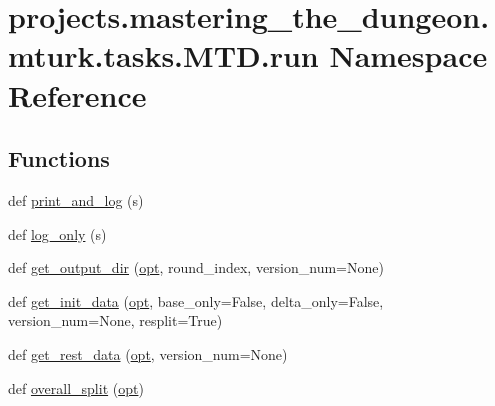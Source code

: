 \hypertarget{namespaceprojects_1_1mastering__the__dungeon_1_1mturk_1_1tasks_1_1MTD_1_1run}{}\section{projects.\+mastering\+\_\+the\+\_\+dungeon.\+mturk.\+tasks.\+M\+T\+D.\+run Namespace Reference}
\label{namespaceprojects_1_1mastering__the__dungeon_1_1mturk_1_1tasks_1_1MTD_1_1run}
\subsection*{Functions}
\begin{DoxyCompactItemize}
\item 
def \hyperlink{namespaceprojects_1_1mastering__the__dungeon_1_1mturk_1_1tasks_1_1MTD_1_1run_acdf4e0fae33f363cf0b352a72788f9bd}{print\+\_\+and\+\_\+log} (s)
\item 
def \hyperlink{namespaceprojects_1_1mastering__the__dungeon_1_1mturk_1_1tasks_1_1MTD_1_1run_ab07d5984a91787cd069fa0a7deba945f}{log\+\_\+only} (s)
\item 
def \hyperlink{namespaceprojects_1_1mastering__the__dungeon_1_1mturk_1_1tasks_1_1MTD_1_1run_a7f8196f264013bc16be3e85fe5c68f0d}{get\+\_\+output\+\_\+dir} (\hyperlink{namespaceprojects_1_1mastering__the__dungeon_1_1mturk_1_1tasks_1_1MTD_1_1run_a9bc5bb7f931e20fd8bad9fbad46b6886}{opt}, round\+\_\+index, version\+\_\+num=None)
\item 
def \hyperlink{namespaceprojects_1_1mastering__the__dungeon_1_1mturk_1_1tasks_1_1MTD_1_1run_ae84843b54586b020d47c60d95340e1d7}{get\+\_\+init\+\_\+data} (\hyperlink{namespaceprojects_1_1mastering__the__dungeon_1_1mturk_1_1tasks_1_1MTD_1_1run_a9bc5bb7f931e20fd8bad9fbad46b6886}{opt}, base\+\_\+only=False, delta\+\_\+only=False, version\+\_\+num=None, resplit=True)
\item 
def \hyperlink{namespaceprojects_1_1mastering__the__dungeon_1_1mturk_1_1tasks_1_1MTD_1_1run_ae9acbe1fe240a624b01fed3f073cc780}{get\+\_\+rest\+\_\+data} (\hyperlink{namespaceprojects_1_1mastering__the__dungeon_1_1mturk_1_1tasks_1_1MTD_1_1run_a9bc5bb7f931e20fd8bad9fbad46b6886}{opt}, version\+\_\+num=None)
\item 
def \hyperlink{namespaceprojects_1_1mastering__the__dungeon_1_1mturk_1_1tasks_1_1MTD_1_1run_a68c9d28aae4d256af00522c8617f93f1}{overall\+\_\+split} (\hyperlink{namespaceprojects_1_1mastering__the__dungeon_1_1mturk_1_1tasks_1_1MTD_1_1run_a9bc5bb7f931e20fd8bad9fbad46b6886}{opt})

\end{DoxyCompactItemize}
